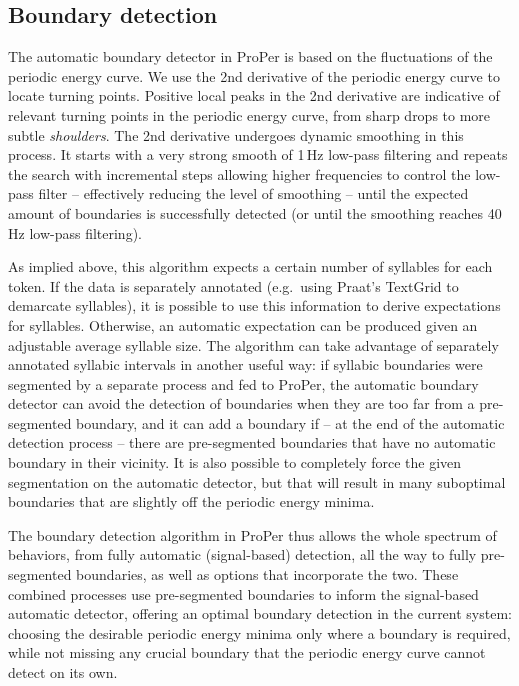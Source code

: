 \subsection{Boundary detection}\label{sec:boundetect}

The automatic boundary detector in ProPer is based on the fluctuations of the periodic energy curve. We use the 2nd derivative of the periodic energy curve to locate turning points. Positive local peaks in the 2nd derivative are indicative of relevant turning points in the periodic energy curve, from sharp drops to more subtle \emph{shoulders}. The 2nd derivative undergoes dynamic smoothing in this process. It starts with a very strong smooth of 1\,Hz low-pass filtering and repeats the search with incremental steps allowing higher frequencies to control the low-pass filter -- effectively reducing the level of smoothing -- until the expected amount of boundaries is successfully detected (or until the smoothing reaches 40\,Hz low-pass filtering).

As implied above, this algorithm expects a certain number of syllables for each token. If the data is separately annotated (e.g.~using Praat's TextGrid to demarcate syllables), it is possible to use this information to derive expectations for syllables. Otherwise, an automatic expectation can be produced given an adjustable average syllable size.
The algorithm can take advantage of separately annotated syllabic intervals in another useful way: if syllabic boundaries were segmented by a separate process and fed to ProPer, the automatic boundary detector can avoid the detection of boundaries when they are too far from a pre-segmented boundary, and it can add a boundary if -- at the end of the automatic detection process -- there are pre-segmented boundaries that have no automatic boundary in their vicinity.
It is also possible to completely force the given segmentation on the automatic detector, but that will result in many suboptimal boundaries that are slightly off the periodic energy minima. 

The boundary detection algorithm in ProPer thus allows the whole spectrum of behaviors, from fully automatic (signal-based) detection, all the way to fully pre-segmented boundaries, as well as options that incorporate the two. These combined processes use pre-segmented boundaries to inform the signal-based automatic detector, offering an optimal boundary detection in the current system: choosing the desirable periodic energy minima only where a boundary is required, while not missing any crucial boundary that the periodic energy curve cannot detect on its own.



